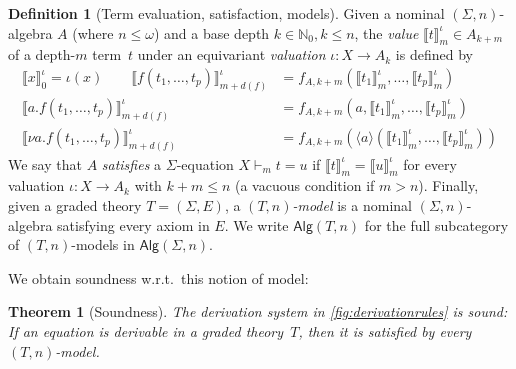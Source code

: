 \documentclass[11pt,a4paper]{amsart}
\newtheorem{theorem}{Theorem}[section]
\newcommand{\Alg}{\mathsf{Alg}}
\theoremstyle{plain}
\numberwithin{equation}{section}
\newcommand{\Nat}{{\mathbb{N}}}
\newcommand{\+}[1]{\mathcal{#1}\xspace}
\theoremstyle{definition}
\newtheorem{defn}[defn]{Definition}
\begin{document}
\begin{defn}[Term evaluation, satisfaction, models]
  Given a nominal \((\Sigma, n)\)-algebra \(A\) (where $n\le\omega$)
  and a base depth \(k \in \Nat_0, k \le n\), the \emph{value}
  \(\llbracket t \rrbracket^\iota_m\in A_{k + m}\) of a depth-$m$
  term~$t$ under an equivariant \emph{valuation}
  \(\iota\colon X \to A_k\) is defined by
  \begin{align*}
    \llbracket x \rrbracket^\iota_0  = \iota(x) \qquad
    \llbracket f(t_1, \ldots, t_p) \rrbracket^\iota_{m + d(f)}  &= f_{A,
      k + m}(\llbracket t_1 \rrbracket^\iota_m, \ldots, \llbracket t_p
    \rrbracket^\iota_m)\\
    \llbracket a.f(t_1, \ldots, t_p) \rrbracket^\iota_{m + d(f)} &=
    f_{A, k + m}(a, \llbracket t_1 \rrbracket^\iota_m, \ldots,
    \llbracket t_p \rrbracket^\iota_m) \\
    \llbracket \nu a.f(t_1,
    \ldots, t_p) \rrbracket^\iota_{m + d(f)}  &= f_{A, k + m}(\langle a
    \rangle (\llbracket t_1 \rrbracket^\iota_m, \ldots, \llbracket t_p
    \rrbracket^\iota_m))
  \end{align*}
  We say that \(A\) \emph{satisfies} a $\Sigma$-equation
  \(X \vdash_m t = u\) if
  \(\llbracket t \rrbracket^\iota_m = \llbracket u
  \rrbracket^\iota_m\) for every valuation \(\iota\colon X \to A_k\)
  with \(k + m \le n\) (a vacuous condition if $m>n$). Finally, given
  a graded theory \(T = (\Sigma, E)\), a \emph{\((T, n)\)-model} is a
  nominal \((\Sigma, n)\)-algebra satisfying every axiom in \(E\).  We
  write \(\Alg(T, n)\) for the full subcategory of \((T, n)\)-models
  in \(\Alg(\Sigma, n)\).
\end{defn}
\noindent %



\noindent We obtain soundness w.r.t.~this notion of model:

\begin{theorem}[Soundness]\label{thm:soundness}
  The derivation system in \cref{fig:derivationrules} is sound: If
  an equation is derivable in a graded theory~$T$, then it is
  satisfied by every \((T, n)\)-model.
\end{theorem}

\end{document}
